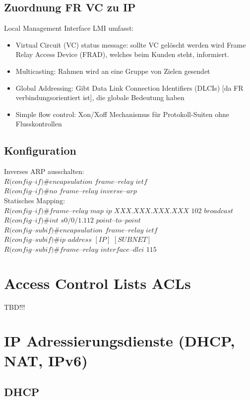 \documentclass[landscape,twocolumn,a4paper]{article}
\begin{document}
\begin{footnotesize}
\subsection{Zuordnung FR VC zu IP}
Local Management Interface LMI umfasst:
\begin{itemize}
	\item Virtual Circuit (VC) status message: sollte VC gelöscht werden wird Frame Relay Access Device (FRAD), welches beim Kunden steht, informiert.
	\item Multicasting: Rahmen wird an eine Gruppe von Zielen gesendet
	\item Global Addressing: Gibt Data Link Connection Identifiers (DLCIs) [da FR verbindungsorientiert ist], die globale Bedeutung haben
	\item Simple flow control: Xon/Xoff Mechanismus für Protokoll-Suiten ohne Flusskontrollen
\end{itemize}
\subsection{Konfiguration}
Inverses ARP ausschalten:\\
$R(config$--$if)\#encapsulation$ $frame$--$relay$ $ietf$\\
$R(config$--$if)\#no$ $frame$--$relay$ $inverse$--$arp$\\
Statisches Mapping:\\
$R(config$--$if)\#frame$--$relay$ $map$ $ip$ $XXX.XXX.XXX.XXX$ $102$ $broadcast$\\
$R(config$--$if)\#int$ $s0/0/1.112$ $point$--$to$--$point$\\
$R(config$--$subif)\#encapsulation$ $frame$--$relay$ $ietf$\\
$R(config$--$subif)\#ip$ $address$ $[IP]$ $[SUBNET]$\\
$R(config$--$subif)\#frame$--$relay$ $interface$--$dlci$ $115$


\section{Access Control Lists ACLs}
TBD!!!
\newpage
\section{IP Adressierungsdienste (DHCP, NAT, IPv6)}
\subsection{DHCP}

\end{footnotesize}
\end{document}
